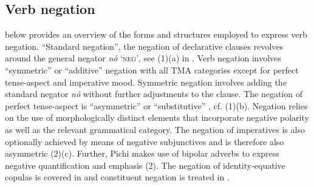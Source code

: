 \subsection{Verb negation}
 below provides an overview of the forms and structures employed to express verb negation. “Standard negation”, the negation of declarative clauses \citep{Miestamo2005} revolves around the general negator \textit{nó} ‘\textsc{neg’,} see (1)(a) in . Verb negation involves “symmetric” \citep{Miestamo2005} or “additive” negation \citep{Jungraithmayr1988} with all TMA categories except for perfect tense-aspect and imperative mood. Symmetric negation involves adding the standard negator \textit{nó} without further adjustments to the clause. The negation of perfect tense-aspect is “asymmetric” \citep{Miestamo2005} or “substitutive” \citep{Jungraithmayr1988}, cf. (1)(b). Negation relies on the use of morphologically distinct elements that incorporate negative polarity as well as the relevant grammatical category. The negation of imperatives is also optionally achieved by means of negative subjunctives and is therefore also asymmetric (2)(c). Further, Pichi makes use of bipolar adverbs to express negative quantification and emphasis (2). The negation of identity-equative copulas is covered in  and constituent negation is treated in .

